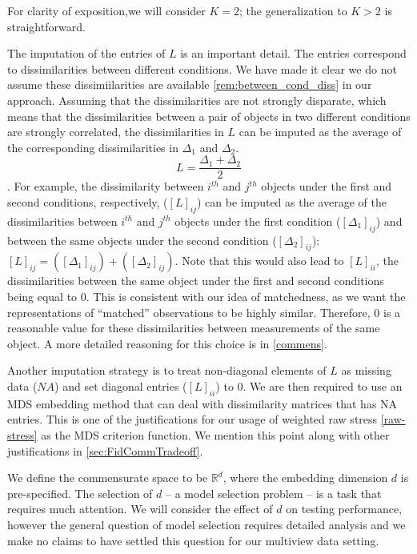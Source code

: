 \documentclass[12pt,oneside,final]{thesis}
\begin{document}
\begin{remark}
For clarity of exposition,we will consider $K=2$; the generalization to $K>2$ is straightforward. 
\end{remark}

\begin{remark}
The imputation of the entries of $L$  is an important detail. The entries correspond to dissimilarities between different conditions. We have made it clear we do not assume these dissimiilarities are available  \ref{rem:between_cond_diss} in our approach. Assuming that the dissimilarities are not strongly disparate, which means that the dissimilarities between a pair of objects in two different conditions are strongly  correlated,  the dissimilarities in $L$ can be imputed as the average of the corresponding dissimilarities in $\Delta_1$ and $\Delta_2$. $$L=\frac{\Delta_1 + \Delta_2}{2}$$. For example, the dissimilarity between $i^{th}$ and $j^{th}$ objects under the first and  second conditions, respectively, ($\left[L \right]_{ij}$) can be imputed as the average of the dissimilarities between $i^{th}$ and $j^{th}$ objects under the first condition ($ \left[\Delta_1 \right]_{ij}$) and between the same objects under the second condition ($ \left[\Delta_2 \right]_{ij}$): $[L]_{ij}= ( [\Delta_1]_{ij}) + ( [\Delta_2]_{ij})$. Note that this would also lead to $[L]_{ii}$, the dissimilarities between the same object  under the first and  second conditions  being equal to $0$. This is consistent with our idea of matchedness, as we want the representations of ``matched'' observations to be highly similar. Therefore, $0$ is a reasonable value for these dissimilarities between measurements of the same object.  A more detailed reasoning for this choice is  in \ref{commens}.

Another imputation strategy is to treat non-diagonal elements of $L$ as missing data ($NA$) and set diagonal entries ($[L]_{ii}$)  to 0. We are then required to use an MDS embedding method that can deal with dissimilarity matrices that has NA entries. This is one of the justifications for our usage of weighted raw stress \ref{raw-stress} as the MDS criterion function. We mention this point along with other justifications in  \autoref{sec:FidCommTradeoff}.
\label{rem:imputationofdiss}
\end{remark}


We define the commensurate space to be  $\mathbb{R}^d$, where the embedding dimension $d$ is pre-specified. The selection of $d$ -- a model selection problem -- is  a task that requires much attention. We will  consider the effect  of $d$ on testing performance, however the general question of model selection requires detailed analysis and we make no claims to have settled this question for our multiview data setting.
\end{document}
